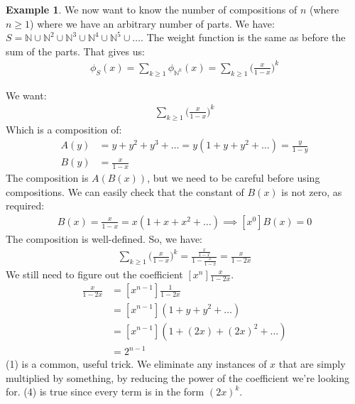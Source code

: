\documentclass[]{article}
\theoremstyle{definition}
\newtheorem{ex}{Example}[section]
\newcommand{\union}{\cup}
\begin{document}
				\begin{ex}
					We now want to know the number of compositions of $n$ (where $n \ge 1$) where we have an arbitrary number of parts. We have: $S = \mathbb{N} \union \mathbb{N}^2 \union \mathbb{N}^3 \union \mathbb{N}^4 \union \mathbb{N}^5 \union \ldots$. The weight function is the same as before \textendash{} the sum of the parts. That gives us:
					\begin{align*}
						\phi_S(x) = \sum_{k \ge 1} \phi_{\mathbb{N}^k}(x) = \sum_{k \ge 1} \bigg( \frac{x}{1 - x} \bigg)^k
					\end{align*}

					We want:
					\begin{align*}
						[x^n]\sum_{k \ge 1} \bigg( \frac{x}{1 - x} \bigg)^k
					\end{align*}
					Which is a composition of:
					\begin{align*}
						A(y) &= y + y^2 + y^3 + \ldots = y(1 + y + y^2 + \ldots) = \frac{y}{1 - y} \\
						B(y) &= \frac{x}{1 - x}
					\end{align*}
					The composition is $A(B(x))$, but we need to be careful before using compositions. We can easily check that the constant of $B(x)$ is not zero, as required:
					\begin{align*}
						B(x) = \frac{x}{1 - x} = x(1 + x + x^2 + \ldots) \implies [x^0]B(x) = 0
					\end{align*}
					The composition is well-defined. So, we have:
					\begin{align*}
						\sum_{k \ge 1} \bigg( \frac{x}{1 - x} \bigg)^k = \frac{\frac{x}{1 - x}}{1 - \frac{x}{1 - x}} = \frac{x}{1 - 2x}
					\end{align*}
					We still need to figure out the coefficient $[x^n]\frac{x}{1 - 2x}$.
					\begin{align}
						[x^n] \frac{x}{1 - 2x} &= [x^{n - 1}] \frac{1}{1 - 2x} \\
						&= [x^{n - 1}](1 + y + y^2 + \ldots) \\
						&= [x^{n - 1}](1 + (2x) + (2x)^2 + \ldots) \\
						&= 2^{n - 1}
					\end{align}
					(1) is a common, useful trick. We eliminate any instances of $x$ that are simply multiplied by something, by reducing the power of the coefficient we're looking for. (4) is true since every term is in the form $(2x)^k$.
				\end{ex}
\end{document}
